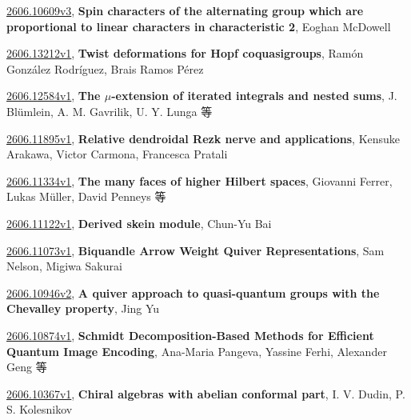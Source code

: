 \documentclass[9pt, a4paper]{article}
\theoremstyle{plain}
\theoremstyle{definition}
\theoremstyle{remark}
\newcommand{\arxiv}[3]{\href{https://arxiv.org/abs/#1}{#1}, \textbf{\textcolor{arxivblue}{#2}}, #3}
\begin{document}
\arxiv{2606.10609v3}{Spin characters of the alternating group which are proportional to linear characters in characteristic 2}{Eoghan McDowell}

\arxiv{2606.13212v1}{Twist deformations for Hopf coquasigroups}{Ramón González Rodríguez, Brais Ramos Pérez}

\arxiv{2606.12584v1}{The $μ$-extension of iterated integrals and nested sums}{J. Blümlein, A. M. Gavrilik, U. Y. Lunga 等}

\arxiv{2606.11895v1}{Relative dendroidal Rezk nerve and applications}{Kensuke Arakawa, Victor Carmona, Francesca Pratali}

\arxiv{2606.11334v1}{The many faces of higher Hilbert spaces}{Giovanni Ferrer, Lukas Müller, David Penneys 等}

\arxiv{2606.11122v1}{Derived skein module}{Chun-Yu Bai}

\arxiv{2606.11073v1}{Biquandle Arrow Weight Quiver Representations}{Sam Nelson, Migiwa Sakurai}

\arxiv{2606.10946v2}{A quiver approach to quasi-quantum groups with the Chevalley property}{Jing Yu}

\arxiv{2606.10874v1}{Schmidt Decomposition-Based Methods for Efficient Quantum Image Encoding}{Ana-Maria Pangeva, Yassine Ferhi, Alexander Geng 等}

\arxiv{2606.10367v1}{Chiral algebras with abelian conformal part}{I. V. Dudin, P. S. Kolesnikov}

\end{document}
